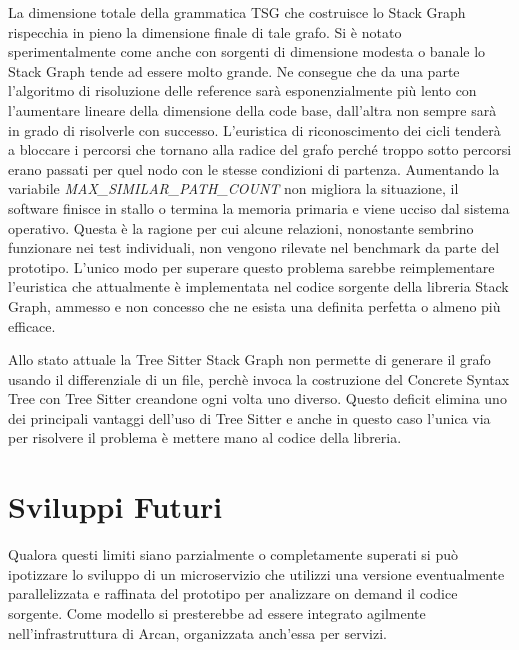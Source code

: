 La dimensione totale della grammatica TSG che costruisce lo Stack Graph rispecchia in pieno la dimensione finale di tale grafo. Si \`e notato sperimentalmente come anche con sorgenti di dimensione modesta o banale lo Stack Graph tende ad essere molto grande. Ne consegue che da una parte l'algoritmo di risoluzione delle reference sar\`a esponenzialmente pi\`u lento con l'aumentare lineare della dimensione della code base, dall'altra non sempre sar\`a in grado di risolverle con successo. L'euristica di riconoscimento dei cicli tender\`a a bloccare i percorsi che tornano alla radice del grafo perch\'e troppo sotto percorsi erano passati per quel nodo con le stesse condizioni di partenza. Aumentando la variabile \emph{MAX\_SIMILAR\_PATH\_COUNT} non migliora la situazione, il software finisce in stallo o termina la memoria primaria e viene ucciso dal sistema operativo. Questa \`e la ragione per cui alcune relazioni, nonostante sembrino funzionare nei test individuali, non vengono rilevate nel benchmark da parte del prototipo. L'unico modo per superare questo problema sarebbe reimplementare l'euristica che attualmente \`e implementata nel codice sorgente della libreria Stack Graph, ammesso e non concesso che ne esista una definita perfetta o almeno pi\`u efficace.


Allo stato attuale la Tree Sitter Stack Graph non permette di generare il grafo usando il differenziale di un file, perch\`e invoca la costruzione del Concrete Syntax Tree con Tree Sitter creandone ogni volta uno diverso. Questo deficit elimina uno dei principali vantaggi dell'uso di Tree Sitter e anche in questo caso l'unica via per risolvere il problema \`e mettere mano al codice della libreria.

\section{Sviluppi Futuri}

Qualora questi limiti siano parzialmente o completamente superati si pu\`o ipotizzare lo sviluppo di un microservizio che utilizzi una versione eventualmente parallelizzata e raffinata del prototipo per analizzare on demand il codice sorgente. Come modello si presterebbe ad essere integrato agilmente nell'infrastruttura di Arcan, organizzata anch'essa per servizi.
